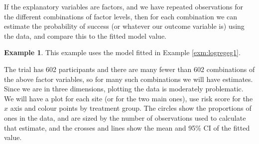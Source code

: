 \documentclass[
  openany]{book}
\newenvironment{Shaded}{\begin{snugshade}}{\end{snugshade}}
\newcommand{\AttributeTok}[1]{\textcolor[rgb]{0.13,0.29,0.53}{#1}}
\newcommand{\CommentTok}[1]{\textcolor[rgb]{0.56,0.35,0.01}{\textit{#1}}}
\newcommand{\DecValTok}[1]{\textcolor[rgb]{0.00,0.00,0.81}{#1}}
\newcommand{\DocumentationTok}[1]{\textcolor[rgb]{0.56,0.35,0.01}{\textbf{\textit{#1}}}}
\newcommand{\FunctionTok}[1]{\textcolor[rgb]{0.13,0.29,0.53}{\textbf{#1}}}
\newcommand{\NormalTok}[1]{#1}
\newcommand{\OtherTok}[1]{\textcolor[rgb]{0.56,0.35,0.01}{#1}}
\newcommand{\SpecialCharTok}[1]{\textcolor[rgb]{0.81,0.36,0.00}{\textbf{#1}}}
\newcommand{\StringTok}[1]{\textcolor[rgb]{0.31,0.60,0.02}{#1}}
\theoremstyle{definition}
\theoremstyle{definition}
\newtheorem{example}{Example}[chapter]
\theoremstyle{definition}
\theoremstyle{definition}
\theoremstyle{remark}
\begin{document}
If the explanatory variables are factors, and we have repeated observations for the different combinations of factor levels, then for each combination we can estimate the probability of success (or whatever our outcome variable is) using the data, and compare this to the fitted model value.

\begin{example}
This example uses the model fitted in Example \ref{exm:logregeg1}.

The trial has 602 participants and there are many fewer than 602 combinations of the above factor variables, so for many such combinations we will have estimates. Since we are in three dimensions, plotting the data is moderately problematic. We will have a plot for each site (or for the two main ones), use risk score for the \(x\) axis and colour points by treatment group. The circles show the proportions of ones in the data, and are sized by the number of observations used to calculate that estimate, and the crosses and lines show the mean and 95\% CI of the fitted value.

\begin{Shaded}
\end{Shaded}
\end{example}
\end{document}
